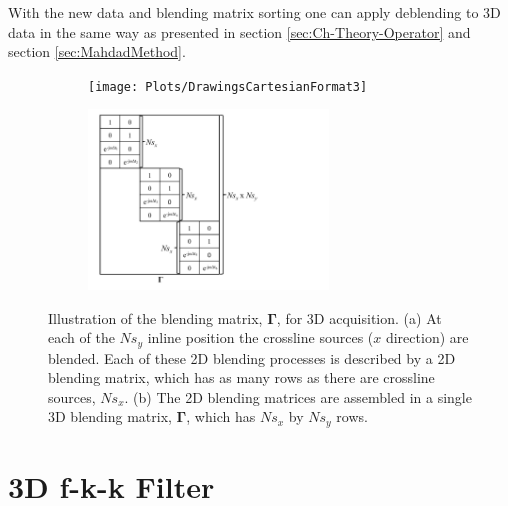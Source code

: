 
With the new data and blending matrix sorting one can apply deblending to 3D data in the same way as presented in section \ref{sec:Ch-Theory-Operator} and section \ref{sec:MahdadMethod}.

\begin{figure}

	\begin{subfigure}[t]{0.5\textwidth}
		\centering
		\texttt{[image: Plots/DrawingsCartesianFormat3]}
		\caption{}
		\label{fig:Ch-Theory-3D-BlendedAcquisition}
	\end{subfigure}
	\begin{subfigure}[t]{0.5\textwidth}
		\centering
		\includegraphics[width = 0.7\textwidth]{Plots/DrawingsCartesianFormat2}
		\caption{}
		\label{fig:Ch-Theory-3D-BlendingMatrix}
	\end{subfigure}
	
	\caption{Illustration of the blending matrix, $\mathbf{\Gamma}$, for 3D acquisition. (a) At each of the $Ns_y$ inline position the crossline sources ($x$ direction) are blended. Each of these 2D blending processes is described by a 2D blending matrix, which has as many rows as there are crossline sources, $Ns_x$. (b) The 2D blending matrices are assembled in a single 3D blending matrix, $\mathbf{\Gamma}$, which has $Ns_x$ by $Ns_y$ rows.}
	\label{fig:Ch-Theory-3D-BlendingMatrix-Design}

\end{figure}


\section{3D f-k-k Filter} \label{sec:Ch-Theory-3dExtension-FKK}

